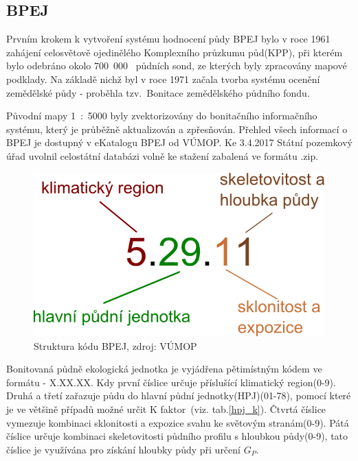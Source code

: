 \subsection{BPEJ}
Prvním krokem k vytvoření systému hodnocení půdy BPEJ bylo v roce 1961
zahájení celosvětově ojedinělého Komplexního průzkumu půd(KPP), při
kterém bylo odebráno okolo 700~000~ půdních sond, ze kterých byly
zpracovány mapové podklady. Na základě nichž byl v roce 1971 začala
tvorba systému ocenění zemědělské půdy - proběhla tzv.~Bonitace
zemědělského půdního fondu.

Původní mapy 1~:~5000 byly zvektorizovány do bonitačního informačního
systému, který je průběžně aktualizován a zpřesňován. Přehled všech
informací o BPEJ je dostupný v eKatalogu BPEJ od
VÚMOP\cite{bpej_vumop}. Ke 3.4.2017 Státní pozemkový úřad uvolnil
celostátní databázi volně ke stažení zabalená ve formátu
.zip\cite{spucr}.
\begin{figure}[H]
    \centering
    \includegraphics[scale=0.5]{./pictures/Struktura_BPEJ.png}
      \caption[Struktura kódu BPEJ]{Struktura kódu BPEJ, zdroj:
        VÚMOP\cite{bpej_vumop}}
      \label{fig:struktura_bpej}
\end{figure}
Bonitovaná půdně ekologická jednotka je vyjádřena pětimístným kódem ve
formátu - X.XX.XX. Kdy první číslice určuje příslušící klimatický
region(0-9). Druhá a třetí zařazuje půdu do hlavní půdní
jednotky(HPJ)(01-78), pomocí které je ve většině případů možné určit K
faktor~(viz. tab.\ref{hpj_k}). Čtvrtá číslice vymezuje kombinaci
sklonitosti a expozice svahu ke světovým stranám(0-9). Pátá číslice
určuje kombinaci skeletovitosti půdního profilu s hloubkou půdy(0-9),
tato číslice je využívána pro získání hloubky půdy při určení
$G_P$.\cite{Novotny2013}
